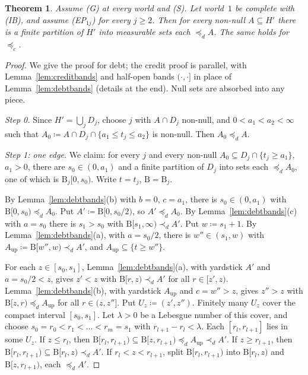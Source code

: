 \documentclass[11pt]{article}
\newtheorem{theorem}{Theorem}
\theoremstyle{definition}\newtheorem{definition}[theorem]{Definition}
\theoremstyle{remark}\newtheorem{remark}[theorem]{Remark}
\newcommand{\Band}{\mathrm{B}}
\begin{document}
\begin{theorem}\label{thm:fine}
Assume (G) at every world and (S). Let world~$1$ be complete with (IB), and
assume (EP$_{1j}$) for every $j\ge2$. Then for every non-null $A\subseteq H'$
there is a finite partition of $H'$ into measurable sets each $\preceq_dA$.
The same holds for $\preceq_c$.
\end{theorem}
\begin{proof}
We give the proof for debt; the credit proof is parallel, with
Lemma~\ref{lem:creditbands} and half-open bands $(\cdot,\cdot]$ in place of
Lemma~\ref{lem:debtbands} (details at the end). Null sets are absorbed into
any piece.

\emph{Step 0.} Since $H'=\bigcup_jD_j$, choose $j$ with $A\cap D_j$ non-null,
and $0<a_1<a_2<\infty$ such that $A_0\coloneqq A\cap D_j\cap\{a_1\le t_j\le
a_2\}$ is non-null. Then $A_0\preceq_dA$.

\emph{Step 1: one edge.} We claim: for every $j$ and every non-null
$A_0\subseteq D_j\cap\{t_j\ge a_1\}$, $a_1>0$, there are $s_0\in(0,a_1)$ and
a finite partition of $D_j$ into sets each $\preceq_dA_0$, one of which is
$\Band_j[0,s_0)$. Write $t=t_j$, $\Band=\Band_j$.

By Lemma~\ref{lem:debtbands}(b) with $b=0$, $c=a_1$, there is $s_0\in(0,a_1)$
with $\Band[0,s_0)\preceq_dA_0$. Put $A'\coloneqq\Band[0,s_0/2)$, so
$A'\preceq_dA_0$. By Lemma~\ref{lem:debtbands}(c) with $a=s_0$ there is
$s_1>s_0$ with $\Band[s_1,\infty)\prec_dA'$. Put $w\coloneqq s_1+1$. By
Lemma~\ref{lem:debtbands}(a), with $a=s_0/2$, there is $w''\in(s_1,w)$ with
$A_{\mathrm{up}}\coloneqq\Band[w'',w)\prec_dA'$, and
$A_{\mathrm{up}}\subseteq\{t\ge w''\}$.

For each $z\in[s_0,s_1]$, Lemma~\ref{lem:debtbands}(a), with yardstick $A'$
and $a=s_0/2<z$, gives $z'<z$ with $\Band[r,z)\prec_dA'$ for all
$r\in[z',z)$. Lemma~\ref{lem:debtbands}(b), with yardstick $A_{\mathrm{up}}$
and $c=w''>z$, gives $z''>z$ with $\Band[z,r)\preceq_dA_{\mathrm{up}}$ for all
$r\in(z,z'']$. Put $U_z\coloneqq(z',z'')$. Finitely many $U_z$ cover the
compact interval $[s_0,s_1]$. Let $\lambda>0$ be a Lebesgue number of this
cover, and choose $s_0=r_0<r_1<\dots<r_m=s_1$ with $r_{l+1}-r_l<\lambda$.
Each $[r_l,r_{l+1}]$ lies in some $U_z$. If $z\le r_l$, then
$\Band[r_l,r_{l+1})\subseteq\Band[z,r_{l+1})\preceq_dA_{\mathrm{up}}\prec_dA'$.
If $z\ge r_{l+1}$, then $\Band[r_l,r_{l+1})\subseteq\Band[r_l,z)\prec_dA'$. If
$r_l<z<r_{l+1}$, split $\Band[r_l,r_{l+1})$ into $\Band[r_l,z)$ and
$\Band[z,r_{l+1})$, each $\preceq_dA'$.


\end{proof}
\end{document}
